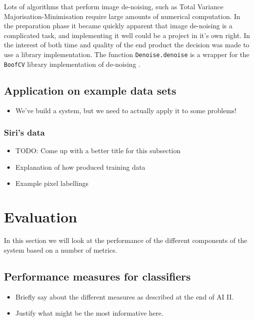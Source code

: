 \documentclass[12pt,twoside,notitlepage]{report}
\begin{document}
        Lots of algorithms that perform image de-noising, such as Total Variance Majorisation-Minimisation \cite{figueiredo2006total} 
        require large amounts of numerical computation. In the preparation phase it became quickly apparent that image 
        de-noising is a complicated task, and implementing it well could be a project in it's own right. In the interest 
        of both time and quality of the end product the decision was made to use a library implementation. The function 
        \texttt{Denoise.denoise} is a wrapper for the \texttt{BoofCV} library implementation of de-noising 
        \cite{BoofCV2012}.



    \section{Application on example data sets}
        \begin{itemize}
            \item We've build a system, but we need to actually apply it to some problems!
        \end{itemize} 

        \subsection{Siri's data}
            \begin{itemize}
                \item TODO: Come up with a better title for this subsection
                \item Explanation of how produced training data
                \item Example pixel labellings
            \end{itemize}









\cleardoublepage
\chapter{Evaluation}
    In this section we will look at the performance of the different components of the system based on a number of 
    metrics. 

    \section{Performance measures for classifiers}
        \begin{itemize}
            \item Briefly say about the different measures as described at the end of AI II.
            \item Justify what might be the most informative here.
        \end{itemize}
\end{document}
